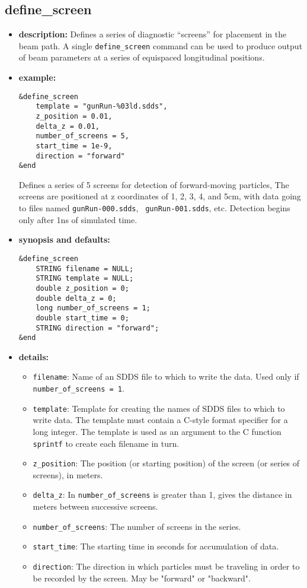 %
\newpage

\subsection{define\_screen}

\begin{itemize}

\item {\bf description:}
Defines a series of diagnostic ``screens'' for placement in the beam
path.  A single {\tt define\_screen} command can be used to produce
output of beam parameters at a series of equispaced longitudinal
positions.

\item {\bf example:} 
\begin{verbatim}
&define_screen
    template = "gunRun-%03ld.sdds",
    z_position = 0.01,
    delta_z = 0.01,
    number_of_screens = 5,
    start_time = 1e-9,
    direction = "forward"
&end
\end{verbatim}
Defines a series of 5 screens for detection of forward-moving
particles, The screens are positioned at z coordinates of 1, 2, 3, 4,
and 5cm, with data going to files named {\tt gunRun-000.sdds}, {\tt
gunRun-001.sdds}, etc.  Detection begins only after 1ns of simulated
time.

\item {\bf synopsis and defaults:} 
\begin{verbatim}
&define_screen
    STRING filename = NULL;
    STRING template = NULL;
    double z_position = 0;
    double delta_z = 0;
    long number_of_screens = 1;
    double start_time = 0;
    STRING direction = "forward";
&end
\end{verbatim}

\item {\bf details:} 
\begin{itemize}
    \item {\tt filename}: Name of an SDDS file to which to write the data.  Used only
        if {\tt number\_of\_screens = 1}.
    \item {\tt template}: Template for creating the names of SDDS files to which to write
        data.  The template must contain a C-style format specifier for a long integer.
        The template is used as an argument to the C function {\tt sprintf} to create each
        filename in turn.
    \item {\tt z\_position}: The position (or starting position) of the screen (or series of
        screens), in meters.
    \item {\tt delta\_z}: In {\tt number\_of\_screens} is greater than 1, gives the distance in
        meters between successive screens.
    \item {\tt number\_of\_screens}: The number of screens in the series.
    \item {\tt start\_time}: The starting time in seconds for accumulation of data.
    \item {\tt direction}: The direction in which particles must be traveling in order to
        be recorded by the screen.  May be "forward" or "backward".
\end{itemize}

\end{itemize}

